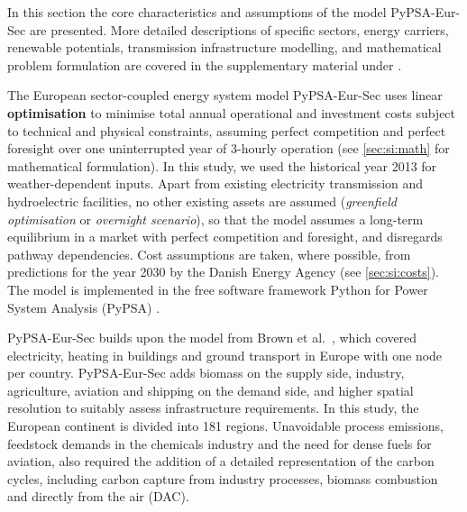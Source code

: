 In this section the core characteristics and assumptions of the model
PyPSA-Eur-Sec are presented. More detailed descriptions of specific sectors,
energy carriers, renewable potentials, transmission infrastructure modelling,
and mathematical problem formulation are covered in the supplementary material
under .

The European sector-coupled energy system model PyPSA-Eur-Sec uses linear
\textbf{optimisation} to minimise total annual operational and investment costs
subject to technical and physical constraints, assuming perfect competition and
perfect foresight over one uninterrupted year of 3-hourly operation (see
\cref{sec:si:math} for mathematical formulation). In this study, we used the
historical year 2013 for weather-dependent inputs. Apart from existing
electricity transmission and hydroelectric facilities, no other existing assets
are assumed (\textit{greenfield optimisation} or \textit{overnight scenario}),
so that the model assumes a long-term equilibrium in a market with perfect
competition and foresight, and disregards pathway dependencies. Cost
assumptions are taken, where possible, from predictions for the year 2030 by the
Danish Energy Agency \cite{dea2019} (see \cref{sec:si:costs}). The model is
implemented in the free software framework Python for Power System Analysis
(PyPSA) \cite{brownPyPSAPython2018}.

PyPSA-Eur-Sec builds upon the model from Brown et
al.~\cite{brownSynergiesSector2018}, which covered electricity, heating in
buildings and ground transport in Europe with one node per country.
PyPSA-Eur-Sec adds biomass on the supply side, industry, agriculture, aviation
and shipping on the demand side, and higher spatial resolution to suitably
assess infrastructure requirements. In this study, the European continent is
divided into 181 regions. Unavoidable process emissions, feedstock demands in
the chemicals industry and the need for dense fuels for aviation, also required
the addition of a detailed representation of the carbon cycles, including carbon
capture from industry processes, biomass combustion and directly from the air
(DAC).

